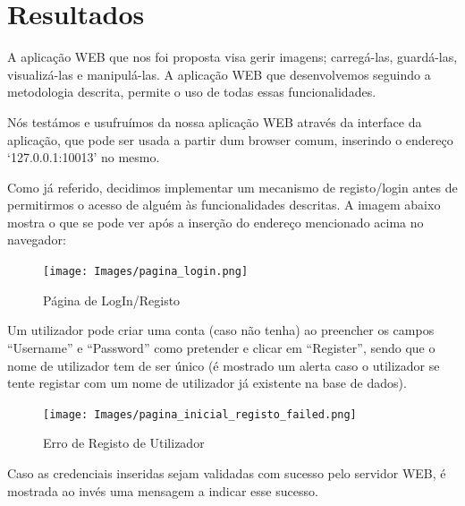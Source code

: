 \documentclass{report}
\begin{document}
 


\chapter{Resultados}
\label{chap.resultados}

A aplicação WEB que nos foi proposta visa gerir imagens; carregá-las, guardá-las, visualizá-las e manipulá-las. A aplicação WEB que desenvolvemos seguindo a metodologia descrita, permite o uso de todas essas funcionalidades.

\linebreak
 \bigskip
 
 Nós testámos e usufruímos da nossa aplicação WEB através da interface da aplicação, que pode ser usada a partir dum browser comum, inserindo o endereço ‘127.0.0.1:10013’ no mesmo. 

\linebreak
 \bigskip
 
    Como já referido, decidimos implementar um mecanismo de registo/login antes de permitirmos o acesso de alguém às funcionalidades descritas. A imagem abaixo mostra o que se pode ver após a inserção do endereço mencionado acima no navegador:

    \begin{figure}[!hbtp]
        \centering 
        \texttt{[image: Images/pagina\_login.png]}
        \caption{\label{Login}Página de LogIn/Registo}
    \end{figure}

    \newpage
    
    Um utilizador pode criar uma conta (caso não tenha) ao preencher os campos “Username” e “Password” como pretender e clicar em “Register”, sendo que o nome de utilizador tem de ser único (é mostrado um alerta caso o utilizador se tente registar com um nome de utilizador já existente na base de dados).

    \bigskip

    \begin{figure}[!hbtp]
        \centering 
        \texttt{[image: Images/pagina\_inicial\_registo\_failed.png]}
        \caption{\label{Erro}Erro de Registo de Utilizador}
    \end{figure}

    Caso as credenciais inseridas sejam validadas com sucesso pelo servidor WEB, é mostrada ao invés uma mensagem a indicar esse sucesso.

    \linebreak
    \bigskip
    \bigskip
 
\end{document}
